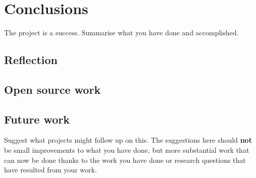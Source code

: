 \chapter{Conclusions}
\label{ch:conclusions} %

The project is a success. Summarise what you have done and accomplished.


\section{Reflection}
\label{sec:reflection} %

\section{Open source work}
\label{sec:open-source-work} %

\section{Future work}
\label{sec:future-work} %

Suggest what projects might follow up on this. The suggestions here should \textbf{not} be small improvements to what you have done, but more substantial work that can now be done thanks to the work you have done or research questions that have resulted from your work.
